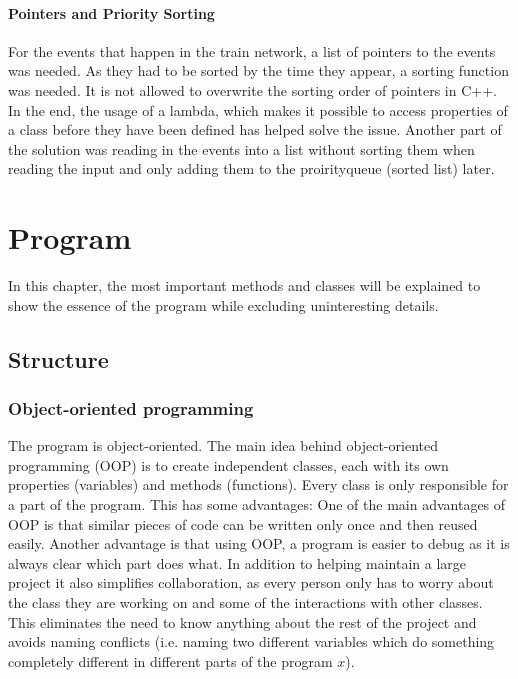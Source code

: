\documentclass[10pt]{scrreprt}
\begin{document}
\subsubsection{Pointers and Priority Sorting}
For the events that happen in the train network, a list of pointers to the events was needed. As they had to be sorted by the time they appear, a sorting function was needed. It is not allowed to overwrite the sorting order of pointers in C++. In the end, the usage of a lambda, which makes it possible to access properties of a class before they have been defined has helped solve the issue. Another part of the solution was reading in the events into a list without sorting them when reading the input and only adding them to the proirityqueue (sorted list) later.

\chapter{Program}

In this chapter, the most important methods and classes will be explained to show the essence of the program while excluding uninteresting details.

\section{Structure}

\subsection{Object-oriented programming}
The program is object-oriented. The main idea behind object-oriented programming (OOP) is to create independent classes, each with its own properties (variables) and methods (functions). Every class is only responsible for a part of the program. This has some advantages: One of the main advantages of OOP is that similar pieces of code can be written only once and then reused easily. Another advantage is that using OOP, a program is easier to debug as it is always clear which part does what. In addition to helping maintain a large project it also simplifies collaboration, as every person only has to worry about the class they are working on and some of the interactions with other classes. This eliminates the need to know anything about the rest of the project and avoids naming conflicts (i.e. naming two different variables which do something completely different in different parts of the program $x$).
\end{document}
